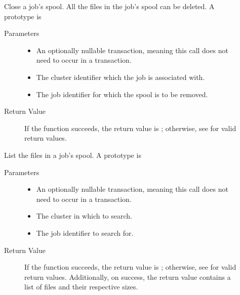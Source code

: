 \begin{description}
\item []
  Close a job's spool.
  All the files in the job's spool can be deleted. 
  A prototype is 


  \begin{description}
    \item[ Parameters]
    \begin{itemize}
      \item {} 
      An optionally nullable transaction, meaning this call does not 
      need to occur in a transaction. 
      \item {} 
      The cluster identifier which the job is associated with. 
      \item {}
      The job identifier for which the spool is to be removed.
    \end{itemize}
    \item[ Return Value]
      If the function succeeds, the return value is ; 
      otherwise, see  for valid return values.
  \end{description}  

\item []
  List the files in a job's spool.
  A prototype is 


  \begin{description}
    \item[ Parameters]
    \begin{itemize}
      \item {} 
      An optionally nullable transaction, meaning this call does not 
      need to occur in a transaction. 
      \item {} The cluster in which to search.
      \item {} The job identifier to search for.
    \end{itemize}
    \item[ Return Value]
      If the function succeeds, the return value is ; 
      otherwise, see  for valid return values. Additionally,
      on success, the return value contains a list of files and their 
      respective sizes.
  \end{description}  

\end{description}

